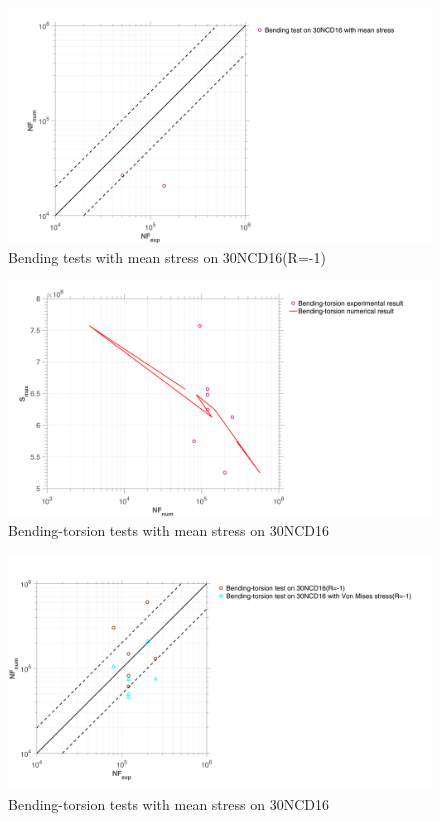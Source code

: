 \documentclass[3p,times,number,review]{elsarticle}
\begin{document}
\begin{figure}[!h]
	\centering
	\includegraphics[width=\textwidth]{figures//b1D_m_30NCD16_err1.png} 
	\caption{Bending tests with mean stress on 30NCD16(R=-1)}
	\label{fig.b1Dm30NCD16err1}
\end{figure}

\begin{figure}[!h]
	\centering
	\includegraphics[width=\textwidth]{figures//bt2D_m_30NCD16_sn.png} 
	\caption{Bending-torsion tests with mean stress on 30NCD16}
	\label{fig.bt2Dm30NCD16sn}
\end{figure}
\begin{figure}[!h]
	\centering
	\includegraphics[width=\textwidth]{figures//bt2D_m_30NCD16_err1.png} 
	\caption{Bending-torsion tests with mean stress on 30NCD16}
	\label{fig.bt2Dm30NCD16err1}
\end{figure}
\end{document}
